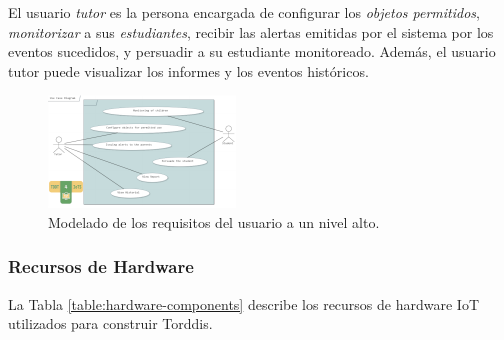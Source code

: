 \documentclass[a4paper,fleqn]{cas-sc}
\begin{document}
				El usuario \textit{tutor} es la persona encargada de configurar los \textit{objetos permitidos}, \textit{monitorizar} a sus \textit{estudiantes}, recibir las alertas emitidas por el sistema por los eventos sucedidos, y persuadir a su estudiante monitoreado. Además, el usuario tutor puede visualizar los informes y los eventos históricos.
				
				\begin{figure}[h]
					\centering
					\includegraphics[frame,scale=0.5, width=\linewidth]{figs/Figure_2}
					\caption{Modelado de los requisitos del usuario a un nivel alto.\label{fig:UseCaseDiagram}}
				\end{figure} 
				
				\subsubsection*{Recursos de Hardware}
					La Tabla \ref{table:hardware-components} describe los recursos de hardware IoT utilizados para construir Torddis. 
					
\end{document}
